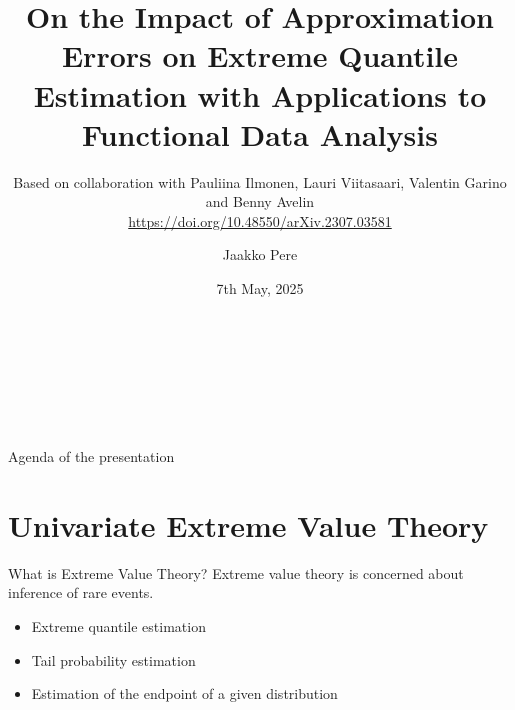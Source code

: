 \documentclass[11pt, aspectratio=169]{beamer}
\author[Jaakko Pere]{Jaakko Pere}
\title{On the Impact of Approximation Errors on Extreme Quantile Estimation with
Applications to Functional Data Analysis}
\subtitle{Based on collaboration with Pauliina Ilmonen, Lauri Viitasaari,
Valentin Garino and Benny Avelin \\
\url{https://doi.org/10.48550/arXiv.2307.03581}}
\date{7th May, 2025}
\institute{Dep.\ of Mathematics and Statistics, University of Helsinki}
\begin{document}
{
  \begin{frame}
    \vspace{2.5cm}
    \begin{center}
      \textcolor{hyblue}{\bf\MakeUppercase{\Large\inserttitle}} \\
      {\footnotesize\insertsubtitle} \\
      {\large\insertauthor} \\
      {\large\insertdate} \\
      {\large\insertinstitute}
    \end{center}
  \end{frame}
}

\begin{frame}{Agenda of the presentation}
  \tableofcontents
\end{frame}

\section{Univariate Extreme Value Theory}


\begin{frame}{What is Extreme Value Theory?}
  Extreme value theory is concerned about inference of rare events.
  \pause
  \vspace{\baselineskip}
  \begin{itemize}
    \item Extreme quantile estimation
    \item Tail probability estimation
    \item Estimation of the endpoint of a given distribution
  \end{itemize}
\end{frame}

\end{document}
